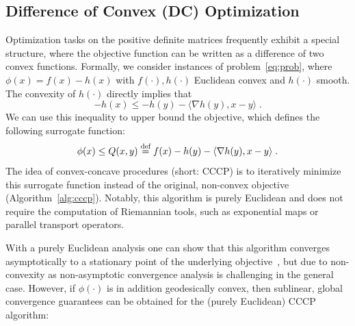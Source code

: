 \documentclass[sn-nature]{sn-jnl}%
\theoremstyle{thmstyleone}%
\theoremstyle{thmstyletwo}%
\theoremstyle{thmstylethree}%
\begin{document}
\subsection{Difference of Convex (DC) Optimization}\label{sec:background-cccp}

Optimization tasks on the positive definite matrices frequently exhibit a special structure, where the objective function can be written as a difference of two convex functions. Formally, we consider instances of problem~\ref{eq:prob}, where $\phi(x) = f(x) - h(x)$ with $f(\cdot), h(\cdot)$ Euclidean convex and $h(\cdot)$ smooth. The convexity of $h(\cdot)$ directly implies that
\begin{equation*}
  -h(x) \le -h(y) - \langle \nabla h(y), x-y \rangle \; .
\end{equation*}
We can use this inequality to upper bound the objective, which defines the following surrogate function:
\begin{equation*}
  \phi(x) \le Q(x, y) \stackrel{\text{def}}{=} f(x)-h(y) - \langle \nabla h(y),x-y \rangle \; .
\end{equation*}
The idea of convex-concave procedures (short: CCCP) is to iteratively minimize this surrogate function instead of the original, non-convex objective (Algorithm~\ref{alg:cccp}). Notably, this algorithm is purely Euclidean and does not require the computation of Riemannian tools, such as exponential maps or parallel transport operators.

With a purely Euclidean analysis one can show that this algorithm converges asymptotically to a stationary point of the underlying objective~\citep{lanckriet2009convergence}, but due to non-convexity as non-asymptotic convergence analysis is challenging in the general case. However, if $\phi(\cdot)$ is in addition geodesically convex, then sublinear, global convergence guarantees can be obtained for the (purely Euclidean) CCCP algorithm:
\end{document}
